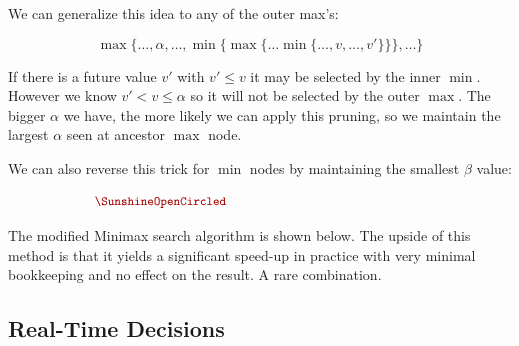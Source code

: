 \documentclass[11pt]{article}
\begin{document}
We can generalize this idea to any of the outer max's:

\[ \max\{ \ldots, \alpha, \ldots, \min\{ \max\{\ldots \min\{\ldots, v, \ldots, v' \} \}\} , \ldots\}\]

If there is a future value $v'$ with $v' \leq v$ it may be selected by the inner $\min$. However we know $v' < v \leq \alpha$ so it will not be selected by the outer $\max$. The bigger $\alpha$ we have, the more likely we can apply this pruning, so we maintain the largest $\alpha$ seen at ancestor $\max$ node. 

We can also reverse this trick for $\min$ nodes by maintaining the smallest $\beta$ value:

\[ \censorm{\min\{ \ldots, \beta, \ldots, \max\{ \min\{\ldots \min\{\ldots, v, \ldots, v' \} \}\} , \ldots\} }\]

The modified Minimax search algorithm is shown below.
The upside of this method is that it yields a significant speed-up in practice with very minimal bookkeeping and no effect on the result. A rare combination.

\begin{algorithm}
\begin{algorithmic}[1]

  \EndIf{}
  \EndFor{}
  
  \EndIf{}
  \EndFor{}
  \EndIf{}
  \EndProcedure{}
\end{algorithmic}
\end{algorithm}



\subsection{Real-Time Decisions}
\end{document}
